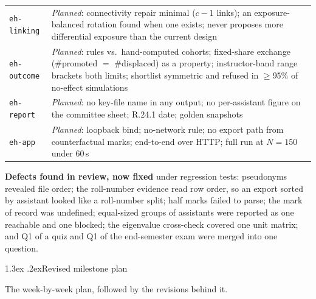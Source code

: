 \documentclass[10pt,a4paper]{article}
\makeatletter
\renewcommand\section{\@startsection{section}{1}{\z@}{-2.8ex \@plus -.6ex \@minus -.2ex}%
  {1.3ex \@plus .2ex}{\normalfont\Large\bfseries}}
\makeatother
\begin{document}
\begin{table}[!htbp]
\begin{tabular}{|l|p{13.7cm}|}
\texttt{eh-linking} & \emph{Planned}: connectivity repair minimal ($c{-}1$ links); an exposure-balanced rotation found when one exists; never proposes more differential exposure than the current design \\
\texttt{eh-outcome} & \emph{Planned}: rules vs.\ hand-computed cohorts; fixed-share exchange (\#promoted $=$ \#displaced) as a property; instructor-band range brackets both limits; shortlist symmetric and refused in $\ge$95\% of no-effect simulations \\
\texttt{eh-report} & \emph{Planned}: no key-file name in any output; no per-assistant figure on the committee sheet; R.24.1 date; golden snapshots \\
\texttt{eh-app} & \emph{Planned}: loopback bind; no-network rule; no export path from counterfactual marks; end-to-end over HTTP; full run at $N{=}150$ under 60\,s \\
\hline
\end{tabular}
\end{table}

\textbf{Defects found in review, now fixed} under regression tests: pseudonyms revealed file order;
the roll-number evidence read row order, so an export sorted by assistant looked like a roll-number
split; half marks failed to parse; the mark of record was undefined; equal-sized groups of assistants
were reported as one reachable and one blocked; the eigenvalue cross-check covered one unit matrix;
and Q1 of a quiz and Q1 of the end-semester exam were merged into one question.

\section{Revised milestone plan}
\label{sec:milestones}

The week-by-week plan, followed by the revisions behind it.
\end{document}
